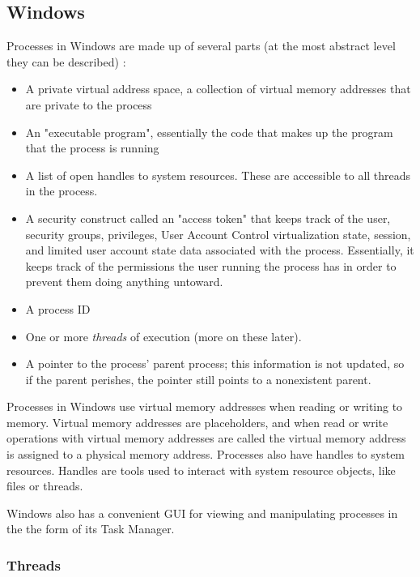 \documentclass[10pt,draftclsnofoot,onecolumn,compsoc]{IEEEtran}
\begin{document}
	\subsection{Windows}
	
	Processes in Windows are made up of several parts (at the most abstract level they can be described) \cite{WInternals}:
	\begin{itemize}
		\item A private virtual address space, a collection of virtual memory addresses that are private to the process
		\item An "executable program", essentially the code that makes up the program that the process is running
		\item A list of open handles to system resources. These are accessible to all threads in the process.
		\item A security construct called an "access token" that keeps track of the user, security groups, privileges, User Account Control virtualization state, session, and limited user account state data associated with the process. Essentially, it keeps track of the permissions the user running the process has in order to prevent them doing anything untoward.
		\item A process ID
		\item One or more \textit{threads} of execution (more on these later).
		\item A pointer to the process' parent process; this information is not updated, so if the parent perishes, the pointer still points to a nonexistent parent.
	\end{itemize}
	
	Processes in Windows use virtual memory addresses when reading or writing to memory. \cite{msdnproc} Virtual memory addresses are placeholders, and when read or write operations with virtual memory addresses are called the virtual memory address is assigned to a physical memory address. \cite{msdnvirt} Processes also have handles to system resources. Handles are tools used to interact with system resource objects, like files or threads. 
	
	Windows also has a convenient GUI for viewing and manipulating processes in the the form of its Task Manager.
	
	\subsubsection{Threads}
	
\end{document}
